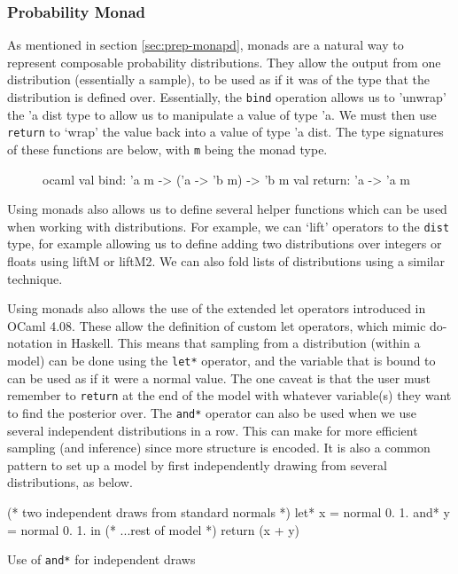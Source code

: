\subsubsection{Probability Monad}
	
As mentioned in section \ref{sec:prep-monapd}, monads are a natural way to represent composable probability distributions. They allow the output from one distribution (essentially a sample), to be used as if it was of the type that the distribution is defined over. Essentially, the \texttt{bind} operation allows us to 'unwrap' the 'a dist type to allow us to manipulate a value of type 'a. We must then use \texttt{return} to `wrap' the value back into a value of type 'a dist. The type signatures of these functions are below, with \texttt{m} being the monad type.
\begin{figure}[!htb]
\centering
\begin{cminted}{ocaml}
val bind: 'a m -> ('a -> 'b m) -> 'b m
val return: 'a -> 'a m
\end{cminted}
\end{figure}
Using monads also allows us to define several helper functions which can be used when working with distributions. For example, we can `lift' operators to the \texttt{dist} type, for example allowing us to define adding two distributions over integers or floats using liftM or liftM2. We can also fold lists of distributions using a similar technique.
	
Using monads also allows the use of the extended let operators introduced in OCaml 4.08. These allow the definition of custom let operators, which mimic do-notation in Haskell. This means that sampling from a distribution (within a model) can be done using the \texttt{let*} operator, and the variable that is bound to can be used as if it were a normal value. The one caveat is that the user must remember to \texttt{return} at the end of the model with whatever variable(s) they want to find the posterior over. The \texttt{and*} operator can also be used when we use several independent distributions in a row. This can make for more efficient sampling (and inference) since more structure is encoded. It is also a common pattern to set up a model by first independently drawing from several distributions, as below.

\begin{listing}
\begin{ocamlcode-in}
(* two independent draws from standard normals *)
let* x = normal 0. 1.
and* y = normal 0. 1. in
(* ...rest of model  *)
return (x + y)
\end{ocamlcode-in}
\caption{Use of \texttt{and*} for independent draws}
\end{listing}

